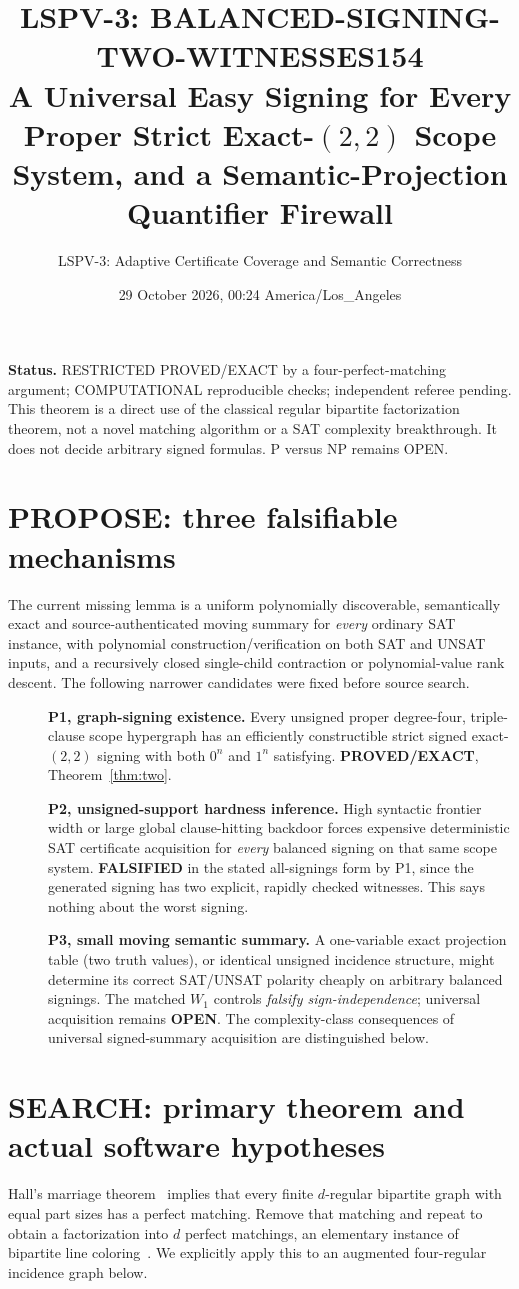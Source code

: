 \documentclass[11pt]{article}
\title{LSPV-3: BALANCED-SIGNING-TWO-WITNESSES154\\A Universal Easy Signing for Every Proper Strict Exact-$(2,2)$ Scope System, and a Semantic-Projection Quantifier Firewall}
\author{LSPV-3: Adaptive Certificate Coverage and Semantic Correctness}
\date{29 October 2026, 00:24 America/Los\_Angeles}
\begin{document}
\maketitle
\noindent\textbf{Status.} RESTRICTED PROVED/EXACT by a four-perfect-matching argument; COMPUTATIONAL reproducible checks; independent referee pending. This theorem is a direct use of the classical regular bipartite factorization theorem, not a novel matching algorithm or a SAT complexity breakthrough. It does not decide arbitrary signed formulas. P versus NP remains OPEN.

\section{PROPOSE: three falsifiable mechanisms}
The current missing lemma is a uniform polynomially discoverable, semantically exact and source-authenticated moving summary for \emph{every} ordinary SAT instance, with polynomial construction/verification on both SAT and UNSAT inputs, and a recursively closed single-child contraction or polynomial-value rank descent. The following narrower candidates were fixed before source search.
\begin{description}
\item[] \textbf{P1, graph-signing existence.} Every unsigned proper degree-four, triple-clause scope hypergraph has an efficiently constructible strict signed exact-$(2,2)$ signing with both $0^n$ and $1^n$ satisfying. \textbf{PROVED/EXACT}, Theorem~\ref{thm:two}.
\item[] \textbf{P2, unsigned-support hardness inference.} High syntactic frontier width or large global clause-hitting backdoor forces expensive deterministic SAT certificate acquisition for \emph{every} balanced signing on that same scope system. \textbf{FALSIFIED} in the stated all-signings form by P1, since the generated signing has two explicit, rapidly checked witnesses. This says nothing about the worst signing.
\item[] \textbf{P3, small moving semantic summary.} A one-variable exact projection table (two truth values), or identical unsigned incidence structure, might determine its correct SAT/UNSAT polarity cheaply on arbitrary balanced signings. The matched $W_1$ controls \emph{falsify sign-independence}; universal acquisition remains \textbf{OPEN}. The complexity-class consequences of universal signed-summary acquisition are distinguished below.
\end{description}

\section{SEARCH: primary theorem and actual software hypotheses}
Hall's marriage theorem~\cite{hall} implies that every finite $d$-regular bipartite graph with equal part sizes has a perfect matching. Remove that matching and repeat to obtain a factorization into $d$ perfect matchings, an elementary instance of bipartite line coloring~\cite{konig}. We explicitly apply this to an augmented four-regular incidence graph below.
\end{document}

